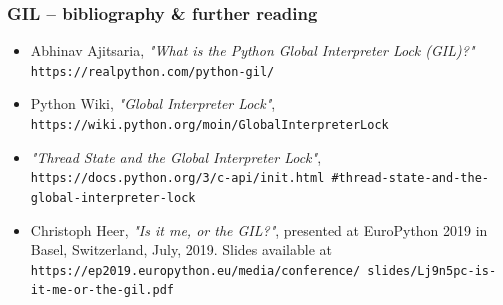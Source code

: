 \documentclass{beamer}
\begin{document}
    \begin{frame}
        \frametitle{GIL -- bibliography \& further reading}
        \begin{itemize}
            \item<1-> Abhinav Ajitsaria, \emph{"What is the Python Global Interpreter Lock (GIL)?"}
            \texttt{https://realpython.com/python-gil/}
            \item<1-> Python Wiki, \emph{"Global Interpreter Lock"},
            \texttt{https://wiki.python.org/moin/GlobalInterpreterLock}
            \item<1-> \emph{"Thread State and the Global Interpreter Lock"},
            \texttt{https://docs.python.org/3/c-api/init.html
            \#thread-state-and-the-global-interpreter-lock}
            \item<1-> Christoph Heer, \emph{"Is it me, or the GIL?"}, presented at
            EuroPython 2019 in Basel, Switzerland, July, 2019.
            Slides available at \texttt{https://ep2019.europython.eu/media/conference/
            slides/Lj9n5pc-is-it-me-or-the-gil.pdf}
        \end{itemize}

    \end{frame}

%    
%    
%
\end{document}
